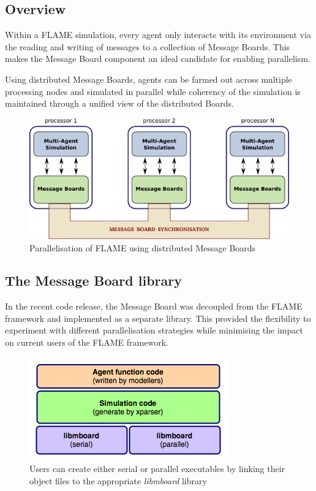 \subsection{Overview}

Within a FLAME simulation, every agent only interacts with its environment via the reading and writing of messages to a collection of Message Boards. This makes the Message Board component an ideal candidate for enabling parallelism. 

Using distributed Message Boards, agents can be farmed out across multiple processing nodes and simulated in parallel while coherency of the simulation is maintained through a unified view of the distributed Boards.

\begin{figure}[ht]
 \centering
  \includegraphics[scale=0.60]{mboard_flame.jpg}
 \caption{Parallelisation of FLAME using distributed Message Boards}
 \label{fig:mb_flame}
\end{figure}

\subsection{The Message Board library}
In the recent code release, the Message Board was decoupled from the FLAME framework and implemented as a separate library. This provided the flexibility to experiment with different parallelisation strategies while minimising the impact on current users of the FLAME framework.

\begin{figure}[ht]
 \centering
  \includegraphics[scale=0.60]{mboard_overview.png}
 \caption{Users can create either serial or parallel executables by linking their object files to the appropriate \textit{libmboard} library}
 \label{fig:mb_overview}
\end{figure}

